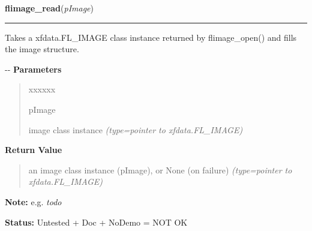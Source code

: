\hspace{.8\funcindent}\begin{boxedminipage}{\funcwidth}

    \raggedright \textbf{flimage\_read}(\textit{pImage})

    \vspace{-1.5ex}

    \rule{\textwidth}{0.5\fboxrule}
\setlength{\parskip}{2ex}

Takes a xfdata.FL\_IMAGE class instance returned by flimage\_open() and
fills the image structure.

-{}-
\setlength{\parskip}{1ex}
      \textbf{Parameters}
      \vspace{-1ex}

      \begin{quote}
        \begin{Ventry}{xxxxxx}

          \item[pImage]


image class instance
            {\it (type=pointer to xfdata.FL\_IMAGE)}

        \end{Ventry}

      \end{quote}

      \textbf{Return Value}
    \vspace{-1ex}

      \begin{quote}

an image class instance (pImage), or None (on failure)
      {\it (type=pointer to xfdata.FL\_IMAGE)}

      \end{quote}

\textbf{Note:} 
e.g. \emph{todo}


\textbf{Status:} 
Untested + Doc + NoDemo = NOT OK


    \end{boxedminipage}

    \label{xformslib:flflimage:flimage_dump}

    \vspace{0.5ex}

